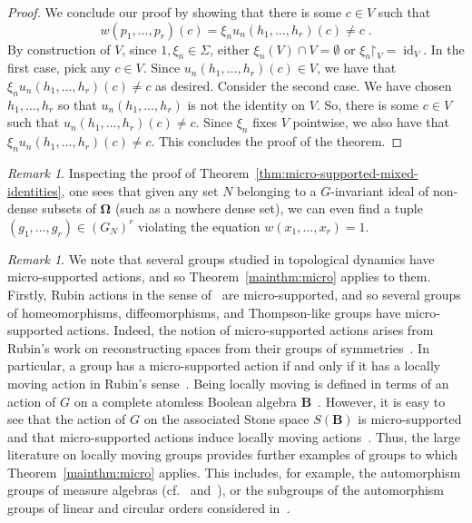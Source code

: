\documentclass{article}
\theoremstyle{remark}
\newtheorem{remark}[theorem]{Remark}
\theoremstyle{definition}
\newcommand{\spOm}{\bm{\Omega}}
\begin{document}
{\begin{proof}
We conclude our proof by showing that there is some $c\in V$ such that $$
w(p_1,\ldots,p_r){(c)}=\xi_n u_n(h_1, \dots, h_r)(c)\neq c\; .$$
{By construction of $V$, since $1,\xi_n\in\Sigma$, either $\xi_n(V)\cap V=\emptyset$ or
$\xi_n\mathord\upharpoonright_V=\operatorname{id}_V$. In the first case, pick any $c\in V$. Since $u_n(h_1, \dots, h_r)(c)\in V$, we have that $\xi_nu_n(h_1,\ldots,h_r)(c)\neq c$ as desired. Consider the second case. We have chosen $h_1, \dots, h_r$  so that  $u_n(h_1, \dots, h_r)$ is not the identity on $V$. So, there is some $c\in V$ such that $u_n(h_1, \dots, h_r)(c)\neq c$. Since $\xi_n$ fixes $V$ pointwise, we also have that $\xi_n u_n(h_1, \dots, h_r)(c)\neq c$. This concludes the proof of the theorem.}
\end{proof}
\begin{remark}
    {Inspecting the proof of Theorem~\ref{thm:micro-supported-mixed-identities}, one sees that given any set $N$ belonging to a $G$-invariant ideal of non-dense subsets of $\spOm$ (such as a nowhere dense set), we can even find a tuple $(g_1,\ldots,g_r)\in (G_{N})^r$ violating the equation $w(x_1,\ldots,x_r)=1$.}
\end{remark}




\begin{remark} {We note that several groups studied in topological dynamics have micro-supported actions, and so Theorem~\ref{mainthm:micro} applies to them. Firstly, Rubin actions in the sense of~\cite{belk2025short} are micro-supported, and so several groups of {homeomorphisms, diffeomorphisms,}
and Thompson-like groups have micro-supported actions. Indeed, the notion of micro-supported actions arises from Rubin's work on reconstructing spaces from their groups of symmetries~\cite{rubin1989reconstruction}. In particular, a group has a micro-supported action if and only if it has a locally moving action in Rubin's sense~\cite{rubin1996locally}. Being locally moving is defined in terms of an action of $G$ on a complete atomless Boolean algebra $\mathbf{B}$~\cite[Definition 2.4]{rubin1996locally}. However, it is easy to see that the action of $G$ on the associated Stone space $S(\mathbf{B})$ is micro-supported and that micro-supported actions induce locally moving actions~\cite[Proposition 1.8 (c)]{rubin1996locally}. Thus, the large literature on locally moving groups provides further examples of groups to which Theorem~\ref{mainthm:micro} applies. This includes, for example, the automorphism groups of measure algebras (cf.~\cite{maharam1942homogeneous} and~\cite[p.127]{rubin1996locally}), or the subgroups of the automorphism groups of linear and circular orders considered in~\cite{mccleary2005locally}.}  
\end{remark}

}
\end{document}
